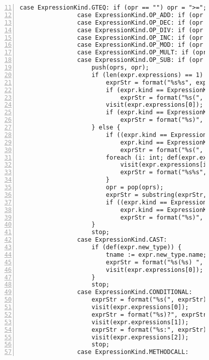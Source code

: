 \begin{figure}[ht!]
\begin{lstlisting}[numbers=left, tabsize=4, escapechar=@, caption={API Usage Mining Analysis},label={lst:aun-code}, firstline = 11, firstnumber = 11, lastline = 60]
                case ExpressionKind.GTEQ: if (opr == "") opr = ">=";
                case ExpressionKind.OP_ADD: if (opr == "") opr = "+";
                case ExpressionKind.OP_DEC: if (opr == "") opr = "--";
                case ExpressionKind.OP_DIV: if (opr == "") opr = "/"; 
                case ExpressionKind.OP_INC: if (opr == "") opr = "++"; 
                case ExpressionKind.OP_MOD: if (opr == "") opr = "%"; 
                case ExpressionKind.OP_MULT: if (opr == "") opr = "*";
                case ExpressionKind.OP_SUB: if (opr == "") opr = "-";
                    push(oprs, opr);
                    if (len(expr.expressions) == 1) {
                        exprStr = format("%s%s", exprStr, pop(oprs));
                        if (expr.kind == ExpressionKind.LOGICAL_NOT)
                            exprStr = format("%s(", exprStr);
                        visit(expr.expressions[0]);
                        if (expr.kind == ExpressionKind.LOGICAL_NOT)
                            exprStr = format("%s)", exprStr);
                    } else {
                        if ((expr.kind == ExpressionKind.ASSIGN && isPP) ||
                            expr.kind == ExpressionKind.LOGICAL_NOT) 
                            exprStr = format("%s(", exprStr);
                        foreach (i: int; def(expr.expressions[i])) {
                            visit(expr.expressions[i]);
                            exprStr = format("%s%s", exprStr, peek(oprs));
                        }
                        opr = pop(oprs);
                        exprStr = substring(exprStr, 0, (len(exprStr)-len(opr)));
                        if ((expr.kind == ExpressionKind.ASSIGN && isPP) ||
                            expr.kind == ExpressionKind.LOGICAL_NOT) 
                            exprStr = format("%s)", exprStr);
                    }
		            stop;
                case ExpressionKind.CAST:
                    if (def(expr.new_type)) {
                        tname := expr.new_type.name;
                        exprStr = format("%s(%s) ", exprStr, tname);
                        visit(expr.expressions[0]); 
                    }
                    stop;
                case ExpressionKind.CONDITIONAL:
                    exprStr = format("%s(", exprStr);
                    visit(expr.expressions[0]);
                    exprStr = format("%s)?", exprStr);
                    visit(expr.expressions[1]);
                    exprStr = format("%s:", exprStr);
                    visit(expr.expressions[2]);
                    stop;
                case ExpressionKind.METHODCALL:

\end{lstlisting}
\end{figure}
